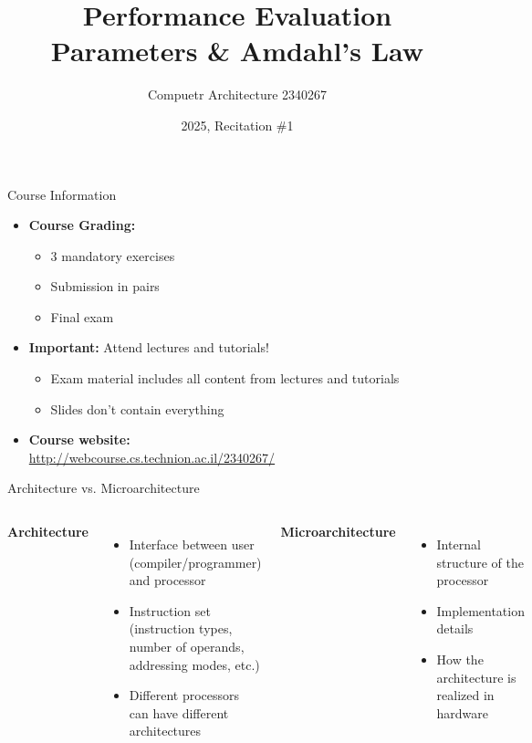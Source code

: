 \documentclass[aspectratio=169,12pt]{beamer}
\title{Performance Evaluation Parameters \& Amdahl's Law}
\author{Compuetr Architecture 2340267}
\date{2025, Recitation \#1}
\begin{document}
\frame{\titlepage}

\begin{frame}{Course Information}
\begin{itemize}
    \item \textbf{Course Grading:}
    \begin{itemize}
        \item 3 mandatory exercises
        \item Submission in pairs
        \item Final exam
    \end{itemize}
    \item \textbf{Important:} Attend lectures and tutorials!
    \begin{itemize}
        \item Exam material includes all content from lectures and tutorials
        \item Slides don't contain everything
    \end{itemize}
    \item \textbf{Course website:}\\
    \url{http://webcourse.cs.technion.ac.il/2340267/}
\end{itemize}
\end{frame}

\begin{frame}{Architecture vs. Microarchitecture}
\begin{columns}
\textbf{Architecture}
\begin{itemize}
    \item Interface between user (compiler/programmer) and processor
    \item Instruction set (instruction types, number of operands, addressing modes, etc.)
    \item Different processors can have different architectures
\end{itemize}

\textbf{Microarchitecture}
\begin{itemize}
    \item Internal structure of the processor
    \item Implementation details
    \item How the architecture is realized in hardware
\end{itemize}
\end{columns}
\end{frame}
\end{document}
